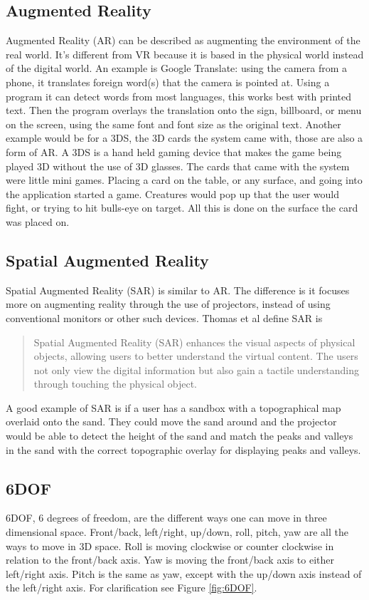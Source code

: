 \documentclass{sig-alternate}
\begin{document}
\subsection{Augmented Reality}
\label{sec:Augmented Reality}
Augmented Reality (AR) can be described as augmenting the environment of the real world. It's different from VR because it is based in the physical world instead of the digital world. An example is Google Translate: using the camera from a phone, it translates foreign word(s) that the camera is pointed at. Using a program it can detect words from most languages, this works best with printed text. Then the program overlays the translation onto the sign, billboard, or menu on the screen, using the same font and font size as the original text. Another example would be for a 3DS, the 3D cards the system came with, those are also a form of AR. A 3DS is a hand held gaming device that makes the game being played 3D without the use of 3D glasses. The cards that came with the system were little mini games. Placing a card on the table, or any surface, and going into the application started a game. Creatures would pop up that the user would fight, or trying to hit bulls-eye on target. All this is done on the surface the card was placed on.   

\subsection{Spatial Augmented Reality}
\label{sec:Spatial Augmented Reality}
Spatial Augmented Reality (SAR) is similar to AR. The difference is it focuses more on augmenting reality through the use of projectors, instead of using conventional monitors or other such devices. Thomas et al \cite{3D} define SAR is 
\begin{quote}
Spatial Augmented Reality (SAR) enhances the visual aspects of physical objects, allowing users to better understand the virtual content. The users not only view the digital information but also gain a tactile understanding through touching the physical object.
\end{quote} 
A good example of SAR is if a user has a sandbox with a topographical map overlaid onto the sand. They could move the sand around and the projector would be able to detect the height of the sand and match the peaks and valleys in the sand with the correct topographic overlay for displaying peaks and valleys. 

\subsection{6DOF}
\label{sec:6DOF}
6DOF, 6 degrees of freedom, are the different ways one can move in three dimensional space. Front/back, left/right, up/down, roll, pitch, yaw are all the ways to move in 3D space. Roll is moving clockwise or counter clockwise in relation to the front/back axis. Yaw is moving the front/back axis to either left/right axis. Pitch is the same as yaw, except with the up/down axis instead of the left/right axis. For clarification see Figure \ref{fig:6DOF}.
\end{document}
